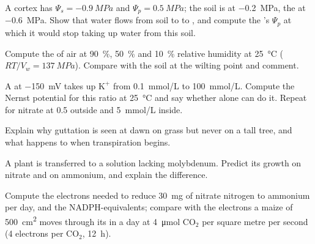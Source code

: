 \begin{exercise}[$\star\star$]\label{exo:b1:plant-water-minerals:5}
A  cortex  has $\Psi_s = \qty{-0.9}{MPa}$ and $\Psi_p =
\qty{0.5}{MPa}$; the soil is at \qty{-0.2}{MPa}, the  at
\qty{-0.6}{MPa}. Show that water flows from soil to  to , and
compute the 's $\Psi_p$ at which it would stop taking up water
from this soil.
\end{exercise}

\begin{exercise}[$\star\star$]\label{exo:b1:plant-water-minerals:6}
Compute the  of air at \qty{90}{\%}, \qty{50}{\%} and
\qty{10}{\%} relative humidity at \qty{25}{\celsius} ($RT/V_w =
\qty{137}{MPa}$). Compare with the soil at the wilting point and
comment.
\end{exercise}

\begin{exercise}[$\star\star$]\label{exo:b1:plant-water-minerals:7}
A   at \qty{-150}{mV} takes up $\mathrm{K^+}$ from
\qty{0.1}{mmol/L} to \qty{100}{mmol/L}. Compute the Nernst potential
for this ratio at \qty{25}{\celsius} and say whether  alone
can do it. Repeat for nitrate at \qty{0.5}{} outside and
\qty{5}{mmol/L} inside.
\end{exercise}

\begin{exercise}[$\star\star$]\label{exo:b1:plant-water-minerals:8}
Explain why guttation is seen at dawn on grass but never on a tall
tree, and what happens to  when transpiration begins.
\end{exercise}

\begin{exercise}[$\star\star$]\label{exo:b1:plant-water-minerals:9}
A plant is transferred to a solution lacking molybdenum. Predict its
growth on nitrate and on ammonium, and explain the difference.
\end{exercise}

\begin{exercise}[$\star\star\star$]\label{exo:b1:plant-water-minerals:10}
Compute the electrons needed to reduce \qty{30}{mg} of nitrate
nitrogen to ammonium per day, and the NADPH-equivalents; compare with
the electrons a maize  of \qty{500}{cm^2} moves through its
 in a day at \qty{4}{\micro mol} $\mathrm{CO_2}$ per square
metre per second (4 electrons per $\mathrm{CO_2}$, \qty{12}{h}).
\end{exercise}

